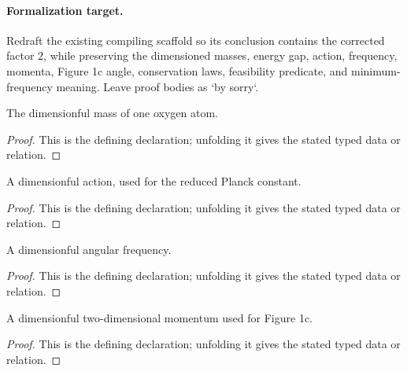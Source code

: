 \paragraph{Formalization target.}
Redraft the existing compiling scaffold so its conclusion contains the corrected
factor \(2\), while preserving the dimensioned masses, energy gap, action,
frequency, momenta, Figure 1c angle, conservation laws, feasibility predicate,
and minimum-frequency meaning.  Leave proof bodies as `by sorry`.

\begin{definition}[MassQuantity]
  \label{decl:physics:IPhO_2026_1_C_1:MassQuantity}
  The dimensionful mass of one oxygen atom.
\end{definition}
\begin{proof}
  This is the defining declaration; unfolding it gives the stated typed data or relation.
\end{proof}

\begin{definition}[ActionQuantity]
  \label{decl:physics:IPhO_2026_1_C_1:ActionQuantity}
  A dimensionful action, used for the reduced Planck constant.
\end{definition}
\begin{proof}
  This is the defining declaration; unfolding it gives the stated typed data or relation.
\end{proof}

\begin{definition}[AngularFrequencyQuantity]
  \label{decl:physics:IPhO_2026_1_C_1:AngularFrequencyQuantity}
  A dimensionful angular frequency.
\end{definition}
\begin{proof}
  This is the defining declaration; unfolding it gives the stated typed data or relation.
\end{proof}

\begin{definition}[MomentumQuantity2]
  \label{decl:physics:IPhO_2026_1_C_1:MomentumQuantity2}
  A dimensionful two-dimensional momentum used for Figure 1c.
\end{definition}
\begin{proof}
  This is the defining declaration; unfolding it gives the stated typed data or relation.
\end{proof}

